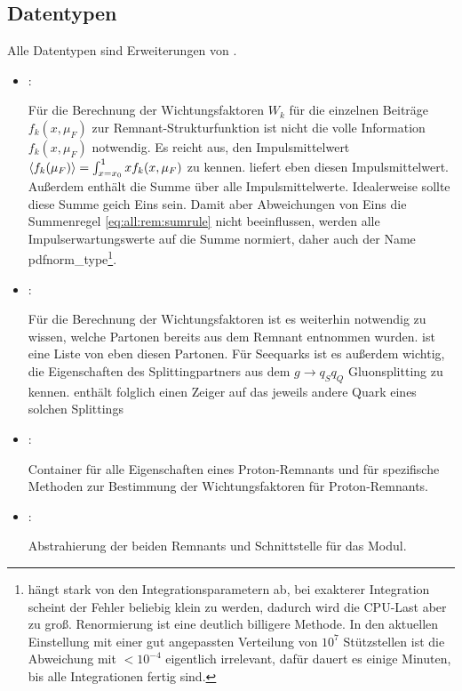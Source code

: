 \subsection{Datentypen}
Alle Datentypen sind Erweiterungen von .
\begin{itemize}
  \item {}:
  
  Für die Berechnung der Wichtungsfaktoren $W_k$ für die einzelnen Beiträge $f_k(x,\mu_F)$ zur Remnant-Strukturfunktion ist nicht die volle Information $f_k(x,\mu_F)$ notwendig. Es reicht aus, den Impulsmittelwert $\left<f_k(\mu_F)\right>=\int_{x=x_0}^{1}xf_k(x,\mu_F)$ zu kennen.  liefert eben diesen Impulsmittelwert. Außerdem enthält  die Summe über alle Impulsmittelwerte. Idealerweise sollte diese Summe geich Eins sein. Damit aber Abweichungen von Eins die Summenregel \eqref{eq:all:rem:sumrule} nicht beeinflussen, werden alle Impulserwartungswerte auf die Summe normiert, daher auch der Name pdfnorm\_type\footnote{hängt stark von den Integrationsparametern ab, bei exakterer Integration scheint der Fehler beliebig klein zu werden, dadurch wird die CPU-Last aber zu groß. Renormierung ist eine deutlich billigere Methode. In den aktuellen Einstellung mit einer gut angepassten Verteilung von $10^7$ Stützstellen ist die Abweichung mit $<10^{-4}$ eigentlich irrelevant, dafür dauert es einige Minuten, bis alle Integrationen fertig sind.}.

\item {}:

  Für die Berechnung der Wichtungsfaktoren ist es weiterhin notwendig zu wissen, welche Partonen bereits aus dem Remnant entnommen wurden.  ist eine Liste von eben diesen Partonen. Für Seequarks ist es außerdem wichtig, die Eigenschaften des Splittingpartners aus dem $g\rightarrow q_Sq_Q$ Gluonsplitting zu kennen.  enthält folglich einen Zeiger  auf das jeweils andere Quark eines solchen Splittings

\item {}:

  Container für alle Eigenschaften eines Proton-Remnants und für spezifische Methoden zur Bestimmung der Wichtungsfaktoren für Proton-Remnants. 

\item {}:

  Abstrahierung der beiden Remnants und Schnittstelle für das Modul.
\end{itemize}



